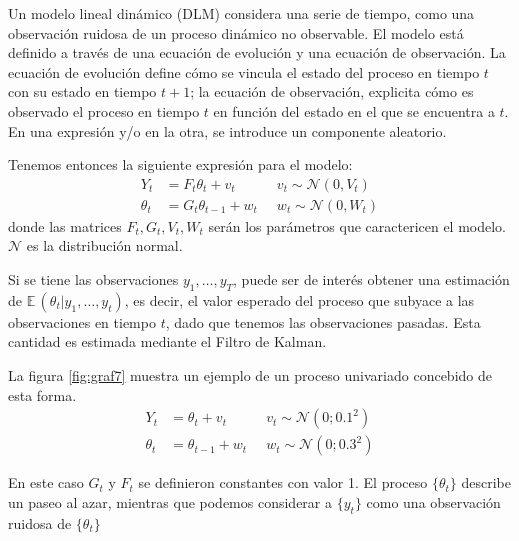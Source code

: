 \documentclass{article}
\newcommand{\E}{\mathbb{E} \,}
\begin{document}
Un modelo lineal dinámico (DLM) considera una serie de tiempo, como una observación ruidosa de un proceso dinámico no observable. El modelo está definido a través de una ecuación de evolución y una ecuación de observación. La ecuación de evolución define cómo se vincula el estado del proceso en tiempo $t$ con su estado en tiempo $t+1$; la ecuación de observación, explicita cómo es observado el proceso en tiempo $t$ en función del estado en el que se encuentra a $t$. En una expresión y/o en la otra, se introduce un componente aleatorio.

Tenemos entonces la siguiente expresión para el modelo:
\begin{equation}
\begin{aligned}
Y_t&=F_t\theta_t + v_t  \;&\;  v_t \sim \mathcal{N}(0,V_t) \\
\theta_t &= G_t \theta_{t-1} + w_t \;&\; w_t \sim \mathcal{N}(0,W_t)
\end{aligned}
\label{eq:modelo}
\end{equation} donde las matrices $F_t,G_t,V_t,W_t$ serán los parámetros que caractericen el modelo. $\mathcal{N}$ es la distribución normal.

Si se tiene las observaciones $y_1,\dots,y_T$, puede ser de interés obtener una estimación de $\E(\theta_t | y_1,\dots,y_t)$, es decir, el valor esperado del proceso que subyace a las observaciones en tiempo $t$, dado que tenemos las observaciones pasadas. Esta cantidad es estimada mediante el Filtro de Kalman.

La figura \ref{fig:graf7} muestra un ejemplo de un proceso univariado concebido de esta forma. 
\begin{equation}
\begin{aligned}
Y_t&=\theta_t + v_t  \;&\;  v_t \sim \mathcal{N}(0;0.1^2) \\
\theta_t &= \theta_{t-1} + w_t \;&\; w_t \sim \mathcal{N}(0;0.3^2)
\end{aligned}
\end{equation}

En este caso $G_t$ y $F_t$ se definieron constantes con valor 1. El proceso $\{\theta_t\}$ describe un paseo al azar, mientras que podemos considerar a $\{y_t\}$ como una observación ruidosa de $\{\theta_t\}$
\end{document}
